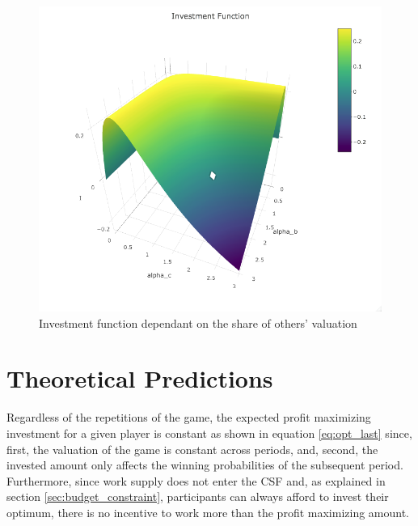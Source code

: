 \begin{figure}[H]
    \centering
    \includegraphics[scale=0.5]{graphs/Investment_Func.png}
    \caption{Investment function dependant on the share of others' valuation}
    \label{fig:invest_func}
\end{figure}

\section{Theoretical Predictions}

Regardless of the repetitions of the game, the expected profit maximizing investment for a given player is constant as shown in equation \ref{eq:opt_last} since, first, the valuation of the game is constant across periods, and, second, the invested amount only affects the winning probabilities of the subsequent period.\\

Furthermore, since work supply does not enter the CSF and, as explained in section \ref{sec:budget_constraint}, participants can always afford to invest their optimum, there is no incentive to work more than the profit maximizing amount.